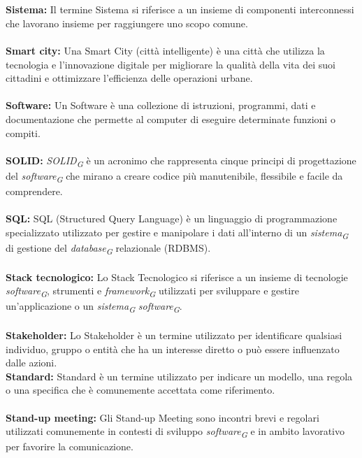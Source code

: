 \documentclass{article}
\begin{document}
\\
\\
\textbf{Sistema:} Il termine Sistema si riferisce a un insieme di componenti interconnessi che lavorano insieme per raggiungere uno scopo comune.
\\
\\
\textbf{Smart city:} Una Smart City (città intelligente) è una città che utilizza la tecnologia e l'innovazione digitale per migliorare la qualità della vita dei suoi cittadini e ottimizzare l'efficienza delle operazioni urbane.
\\
\\
\textbf{Software:} Un Software è una collezione di istruzioni, programmi, dati e documentazione che permette al computer di eseguire determinate funzioni o compiti.
\\
\\
\textbf{SOLID:} \textit{SOLID}\textsubscript{\textit{G}} è un acronimo che rappresenta cinque principi di progettazione del \textit{software}\textsubscript{\textit{G}} che mirano a creare codice più manutenibile, flessibile e facile da comprendere.
\\
\\
\textbf{SQL:} SQL (Structured Query Language) è un linguaggio di programmazione specializzato utilizzato per gestire e manipolare i dati all'interno di un \textit{sistema}\textsubscript{\textit{G}} di gestione del \textit{database}\textsubscript{\textit{G}} relazionale (RDBMS).
\\
\\
\textbf{Stack tecnologico:} Lo Stack Tecnologico si riferisce a un insieme di tecnologie \textit{software}\textsubscript{\textit{G}}, strumenti e \textit{framework}\textsubscript{\textit{G}} utilizzati per sviluppare e gestire un'applicazione o un \textit{sistema}\textsubscript{\textit{G}} \textit{software}\textsubscript{\textit{G}}.
\\
\\
\textbf{Stakeholder:} Lo Stakeholder è un termine utilizzato per identificare qualsiasi individuo, gruppo o entità che ha un interesse diretto o può essere influenzato dalle azioni.
\pagebreak
\\
\textbf{Standard:} Standard è un termine utilizzato per indicare un modello, una regola o una specifica che è comunemente accettata come riferimento.
\\
\\
\textbf{Stand-up meeting:} Gli Stand-up Meeting sono incontri brevi e regolari utilizzati comunemente in contesti di sviluppo \textit{software}\textsubscript{\textit{G}} e in ambito lavorativo per favorire la comunicazione.
\end{document}

